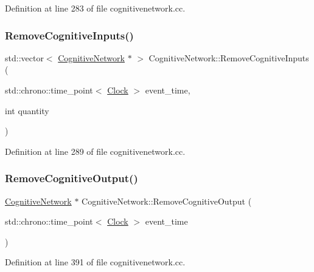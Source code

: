 Definition at line 283 of file cognitivenetwork.\+cc.

\mbox{\label{class_cognitive_network_aaaf93e7c732b1e1e81060f82ff73c93a}} 
\subsubsection{\texorpdfstring{Remove\+Cognitive\+Inputs()}{RemoveCognitiveInputs()}}
{\footnotesize\ttfamily std\+::vector$<$ \mbox{\hyperlink{class_cognitive_network}{Cognitive\+Network}} $\ast$ $>$ Cognitive\+Network\+::\+Remove\+Cognitive\+Inputs (\begin{DoxyParamCaption}\item[{std\+::chrono\+::time\+\_\+point$<$ \mbox{\hyperlink{universe_8h_a0ef8d951d1ca5ab3cfaf7ab4c7a6fd80}{Clock}} $>$}]{event\+\_\+time,  }\item[{int}]{quantity }\end{DoxyParamCaption})}



Definition at line 289 of file cognitivenetwork.\+cc.

\mbox{\label{class_cognitive_network_a9874b11ac465c84ccf7baab0a40fb84e}} 
\subsubsection{\texorpdfstring{Remove\+Cognitive\+Output()}{RemoveCognitiveOutput()}}
{\footnotesize\ttfamily \mbox{\hyperlink{class_cognitive_network}{Cognitive\+Network}} $\ast$ Cognitive\+Network\+::\+Remove\+Cognitive\+Output (\begin{DoxyParamCaption}\item[{std\+::chrono\+::time\+\_\+point$<$ \mbox{\hyperlink{universe_8h_a0ef8d951d1ca5ab3cfaf7ab4c7a6fd80}{Clock}} $>$}]{event\+\_\+time }\end{DoxyParamCaption})}



Definition at line 391 of file cognitivenetwork.\+cc.

